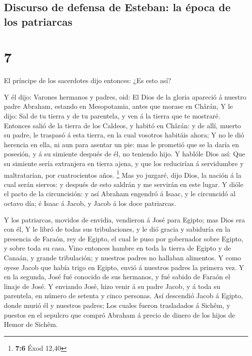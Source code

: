 \hypertarget{discurso-de-defensa-de-esteban-la-uxe9poca-de-los-patriarcas}{%
\subsection{Discurso de defensa de Esteban: la época de los
patriarcas}\label{discurso-de-defensa-de-esteban-la-uxe9poca-de-los-patriarcas}}

\hypertarget{section-6}{%
\section{7}\label{section-6}}

 El príncipe de los sacerdotes dijo entonces: ¿Es esto así?

 Y él dijo: Varones hermanos y padres, oid: El Dios de la
gloria apareció á nuestro padre Abraham, estando en Mesopotamia, antes
que morase en Chârán,  Y le dijo: Sal de tu tierra y de tu
parentela, y ven á la tierra que te mostraré.  Entonces
salió de la tierra de los Caldeos, y habitó en Chârán: y de allí, muerto
su padre, le traspasó á esta tierra, en la cual vosotros habitáis ahora;
 Y no le dió herencia en ella, ni aun para asentar un pie:
mas le prometió que se la daría en posesión, y á su simiente después de
él, no teniendo hijo.  Y hablóle Dios así: Que su simiente
sería extranjera en tierra ajena, y que los reducirían á servidumbre y
maltratarían, por cuatrocientos años. \footnote{\textbf{7:6} Éxod 12,40}
 Mas yo juzgaré, dijo Dios, la nación á la cual serán
siervos: y después de esto saldrán y me servirán en este lugar.
 Y dióle el pacto de la circuncisión: y así Abraham engendró
á Isaac, y le circuncidó al octavo día; é Isaac á Jacob, y Jacob á los
doce patriarcas.

 Y los patriarcas, movidos de envidia, vendieron á José para
Egipto; mas Dios era con él,  Y le libró de todas sus
tribulaciones, y le dió gracia y sabiduría en la presencia de Faraón,
rey de Egipto, el cual le puso por gobernador sobre Egipto, y sobre toda
su casa.  Vino entonces hambre en toda la tierra de Egipto
y de Canaán, y grande tribulación; y nuestros padres no hallaban
alimentos.  Y como oyese Jacob que había trigo en Egipto,
envió á nuestros padres la primera vez.  Y en la segunda,
José fué conocido de sus hermanos, y fué sabido de Faraón el linaje de
José.  Y enviando José, hizo venir á su padre Jacob, y á
toda su parentela, en número de setenta y cinco personas. 
Así descendió Jacob á Egipto, donde murió él y nuestros padres;
 Los cuales fueron trasladados á Sichêm, y puestos en el
sepulcro que compró Abraham á precio de dinero de los hijos de Hemor de
Sichêm.

